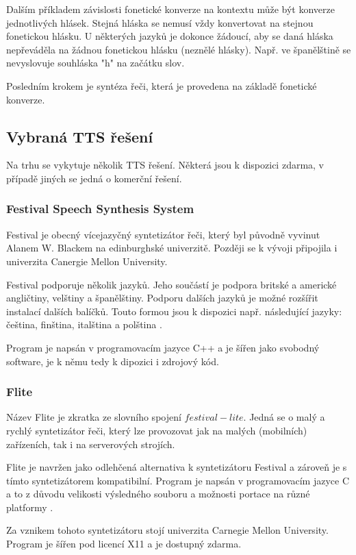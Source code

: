 \documentclass[ing,male,java,dept460]{diploma}						%
\begin{document}
Dalším příkladem závislosti fonetické konverze na kontextu může být konverze jednotlivých hlásek. Stejná hláska se nemusí vždy konvertovat na stejnou fonetickou hlásku. U některých jazyků je dokonce žádoucí, aby se daná hláska nepřeváděla na žádnou fonetickou hlásku (neznělé hlásky). Např. ve španělštině se nevyslovuje souhláska "h" na začátku slov.

Posledním krokem je syntéza řeči, která je provedena na základě fonetické konverze.

\subsection{Vybraná TTS řešení}
Na trhu se vykytuje několik TTS řešení. Některá jsou k dispozici zdarma, v případě jiných se jedná o komerční řešení.

\subsubsection{Festival Speech Synthesis System}
Festival je obecný vícejazyčný syntetizátor řeči, který byl původně vyvinut Alanem W. Blackem na edinburghské univerzitě. Později se k vývoji připojila i univerzita Canergie Mellon University.

Festival podporuje několik jazyků. Jeho součástí je podpora britské a americké angličtiny, velštiny a španělštiny. Podporu dalších jazyků je možné rozšířit instalací dalších balíčků. Touto formou jsou k dispozici např. následující jazyky: čeština, finština, italština a polština \cite{festival_wiki}.

Program je napsán v programovacím jazyce C++ a je šířen jako svobodný software, je k němu tedy k dipozici i zdrojový kód.

\subsubsection{Flite}
\label{sec:flite}
Název Flite je zkratka ze slovního spojení $festival-lite$. Jedná se o malý a rychlý syntetizátor řeči, který lze provozovat jak na malých (mobilních) zařízeních, tak i na serverových strojích.

Flite je navržen jako odlehčená alternativa k syntetizátoru Festival a zároveň je s tímto syntetizátorem kompatibilní. Program je napsán v programovacím jazyce C a to z důvodu velikosti výsledného souboru a možnosti portace na různé platformy \cite{festvox_org}.

Za vznikem tohoto syntetizátoru stojí univerzita Carnegie Mellon University. Program je šířen pod licencí X11 a je dostupný zdarma.
\end{document}
